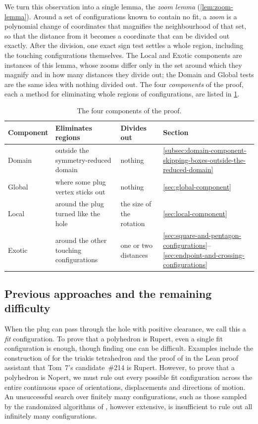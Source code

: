 We turn this observation into a single lemma, the \emph{zoom lemma}
(\cref{lem:zoom-lemma}). Around a set of configurations known to contain
no fit, a \emph{zoom} is a polynomial change of coordinates that
magnifies the neighbourhood of that set, so that the distance from it
becomes a coordinate that can be divided out exactly. After the division,
one exact sign test settles a whole region, including the touching
configurations themselves. The Local and Exotic components are instances of
this lemma, whose zooms differ only in the set around which they magnify
and in how many distances they divide out; the Domain and Global tests are
the same idea with nothing divided out. The four \emph{components} of the
proof, each a method for eliminating whole regions of configurations, are
listed in \cref{tab:components}.

\begin{table}[htbp]
\centering
\small
\begin{tabular}{llll}
  \toprule
  Component & Eliminates regions & Divides out & Section\\
  \midrule
  Domain & outside the symmetry-reduced domain & nothing & \ref{subsec:domain-component-skipping-boxes-outside-the-reduced-domain}\\
  Global & where some plug vertex sticks out & nothing & \ref{sec:global-component}\\
  Local & around the plug turned like the hole & the size of the rotation & \ref{sec:local-component}\\
  Exotic & around the other touching configurations & one or two distances & \ref{sec:square-and-pentagon-configurations}--\ref{sec:endpoint-and-crossing-configurations}\\
  \bottomrule
\end{tabular}
\caption{The four components of the proof.}
\label{tab:components}
\end{table}

\subsection{Previous approaches and the remaining difficulty}\label{subsec:previous-approaches-and-the-remaining-difficulty}

When the plug can pass through the hole with positive clearance, we call
this a \emph{fit} configuration.
To prove that a polyhedron is Rupert, even a single fit configuration is
enough, though finding one can be difficult. Examples include the
construction of \citet{Fredriksson2024} for the triakis tetrahedron and
the proof of \citet{RenshawRupertLean} in the Lean proof assistant that
Tom~7's candidate~\#214 is Rupert.
However, to prove that a polyhedron is Nopert, we must rule out every
possible fit configuration across the entire continuous space of
orientations, displacements and directions of motion. An unsuccessful
search over finitely many configurations, such as those sampled by the
randomized algorithms of \citet{SteiningerYurkevich2023}, however extensive,
is insufficient to rule out all infinitely many configurations.

